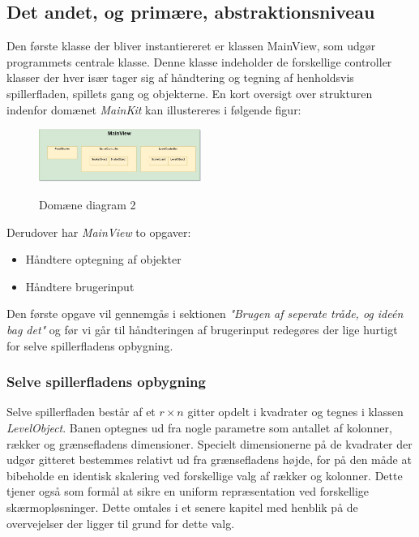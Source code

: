 \documentclass[]{article}
\begin{document}
\subsection{Det andet, og primære, abstraktionsniveau}
Den første klasse der bliver instantiereret er klassen MainView, som udgør programmets centrale klasse. Denne klasse indeholder de forskellige controller klasser der hver især tager sig af håndtering og tegning af henholdsvis spillerfladen, spillets gang og objekterne. En kort oversigt over strukturen indenfor domænet \textit{MainKit} kan illustereres i følgende figur:

\begin{figure}[h!]
	\centering
	\includegraphics[width=200px]{Domain_diagram.jpg}
	\label{fig:diagram2}
	\caption{Domæne diagram 2}
\end{figure}

Derudover har \textit{MainView} to opgaver:
\begin{itemize}
	\item Håndtere optegning af objekter
	\item Håndtere brugerinput
\end{itemize}

Den første opgave vil gennemgås i sektionen \textit{"Brugen af seperate tråde, og ideén bag det"} og før vi går til håndteringen af brugerinput redegøres der lige hurtigt for selve spillerfladens opbygning.

\subsubsection{Selve spillerfladens opbygning}

Selve spillerfladen består af et $r \times n$ gitter opdelt i kvadrater og tegnes i klassen \textit{LevelObject}. Banen optegnes ud fra nogle parametre som antallet af kolonner, rækker og grænsefladens dimensioner. Specielt dimensionerne på de kvadrater der udgør gitteret bestemmes relativt ud fra grænsefladens højde, for på den måde at bibeholde en identisk skalering ved forskellige valg af rækker og kolonner. Dette tjener også som formål at sikre en uniform repræsentation ved forskellige skærmopløsninger. Dette omtales i et senere kapitel med henblik på de overvejelser der ligger til grund for dette valg.
\end{document}
